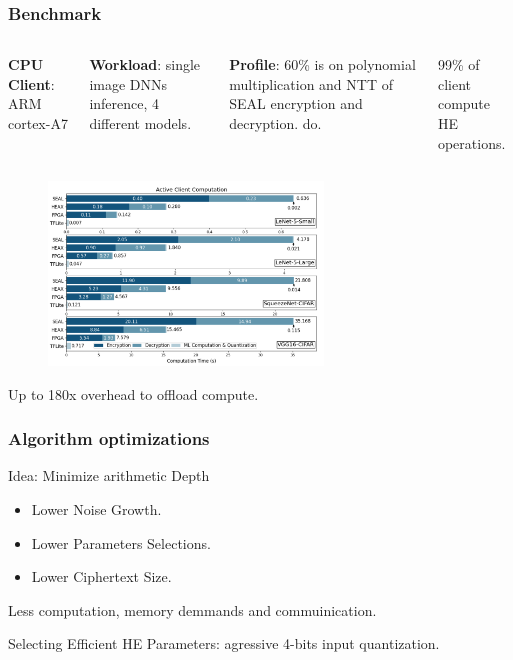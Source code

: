 \documentclass[10pt,handout]{beamer}
\begin{document}
\begin{frame}
\frametitle{Benchmark}
\begin{columns}
    \textbf{CPU Client}: ARM cortex-A7
    \vspace{0.2cm}

    \textbf{Workload}: single image DNNs inference, 4 different models.

    \textbf{Profile}: 60\% is on polynomial multiplication and NTT of SEAL encryption and decryption.
do.
    \vspace{0.2cm}

99\% of client compute HE operations.
\end{columns}


    \vspace{-0.3cm}

\begin{figure}
    \includegraphics[width=0.65\textwidth]{motivation.png}
\end{figure}
\centering
Up to 180x overhead to offload compute.


\end{frame}



\begin{frame}
\frametitle{Algorithm optimizations}

    Idea: Minimize arithmetic Depth %

    \begin{itemize}
        \item Lower Noise Growth.
        \item Lower Parameters Selections.
        \item Lower Ciphertext Size.
    \end{itemize}

    Less computation, memory demmands and commuinication.

    Selecting Efficient HE Parameters: agressive 4-bits input quantization.
\end{frame}
\end{document}
